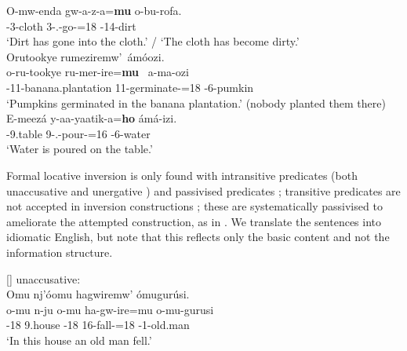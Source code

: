 \documentclass[output=paper]{langscibook}
\begin{document}
\ex
\gll
O-mw-enda  gw-a-z-a=\textbf{mu}  o-bu-rofa.\\
\AUG{}-3-cloth  3-\N{}.\PST{}-go-\FV{}=18  \AUG{}-14-dirt\\
\glt
‘Dirt has gone into the cloth.’ / ‘The cloth has become dirty.’\\

\ex
Orutookye rumeziremw’~ámóozi.\\
\gll
o-ru-tookye  ru-mer-ire=\textbf{mu}~  a-ma-ozi\\
\AUG{}-11-banana.plantation  11\SM{}-germinate-\PFV{}=18  \AUG{}-6-pumkin\\
\glt
‘Pumpkins germinated in the banana plantation.’ (nobody planted them there)\\

\ex
\label{bkm:Ref151453758}
\gll
E-meezá  y-aa-yaatik-a=\textbf{ho}  ámá-izi.\\
\AUG{}-9.table  9\SM{}-\N{}.\PST{}-pour-\FV{}=16  \AUG{}-6-water\\
\glt
‘Water is poured on the table.’\\


\z


Formal locative inversion is only found with intransitive predicates (both unaccusative  and unergative ) and passivised predicates ; transitive predicates are not accepted in inversion constructions ; these are systematically passivised to ameliorate the attempted construction, as in . We translate the sentences into idiomatic English, but note that this reflects only the basic content and not the information structure.\largerpage

\ea
[]{
\label{bkm:Ref113445288}
unaccusative:\\
Omu nj’óomu hagwiremw’ ómugurúsi.\\
\gll
o-mu  n-ju  o-mu  ha-gw-ire=mu  o-mu-gurusi\\
\AUG{}-18  9.house  \AUG{}-18{}  16\SM{}-fall-\PFV{}=18  \AUG{}-1-old.man\\
\glt
‘In this house an old man fell.’\\
}
\end{document}
